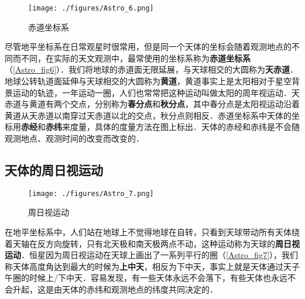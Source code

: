 \begin{figure}[ht]
\centering
\texttt{[image: ./figures/Astro\_6.png]}
\caption{赤道坐标系} \label{Astro_fig6}
\end{figure}

尽管地平坐标系在日常观星时很常用，但是同一个天体的坐标会随着观测地点的不同而不同，在实际的天文观测中，最常使用的坐标系称为\textbf{赤道坐标系}（\autoref{Astro_fig6}）．我们将地球的赤道面无限延展，与天球相交的大圆称为\textbf{天赤道}．地球公转轨道面延伸与天球相交的大圆称为\textbf{黄道}，黄道事实上是太阳相对于星空背景运动的轨迹，一年运动一圈，人们也常常把这种运动叫做太阳的周年视运动．天赤道与黄道有两个交点，分别称为\textbf{春分点}和\textbf{秋分点}，其中春分点是太阳视运动沿着黄道从天赤道以南穿过天赤道以北的交点，秋分点则相反．赤道坐标系中天体的坐标用\textbf{赤经}和\textbf{赤纬}来度量，具体的度量方法在图上标出．天体的赤经和赤纬是不会随观测地点、观测时间的改变而改变的．

\subsection{天体的周日视运动}

\begin{figure}[ht]
\centering
\texttt{[image: ./figures/Astro\_7.png]}
\caption{周日视运动} \label{Astro_fig7}
\end{figure}

在地平坐标系中，人们站在地球上不觉得地球在自转，只看到天球带动所有天体绕着天轴在反方向旋转，只有北天极和南天极两点不动，这种运动称为天球的\textbf{周日视运动}．恒星因为周日视运动在天球上画出了一系列平行的圈（\autoref{Astro_fig7}），我们称天体高度角达到最大的时候为\textbf{上中天}，相反为下中天，事实上就是天体通过天子午圈的时候上/下中天．容易发现，有一些天体永远不会落下，有些天体也永远不会升起，这是由天体的赤纬和观测地点的纬度共同决定的．

